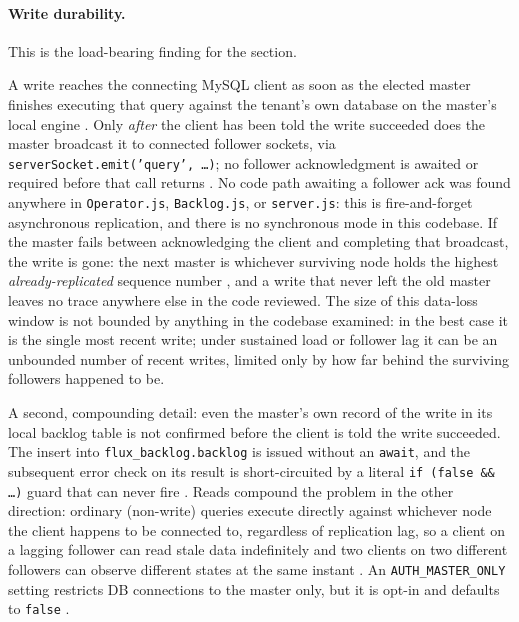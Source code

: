 \paragraph{Write durability.} This is the load-bearing finding for the section.

\begin{property}
\label{prop:sharedb-durability}
A write reaches the connecting MySQL client as soon as the elected master finishes
executing that query against the tenant's own database on the master's local engine
. Only \emph{after} the
client has been told the write succeeded does the master broadcast it to connected
follower sockets, via \texttt{serverSocket.emit('query', \ldots)}; no follower
acknowledgment is awaited or required before that call returns
. No code path awaiting
a follower ack was found anywhere in \texttt{Operator.js}, \texttt{Backlog.js}, or
\texttt{server.js}: this is fire-and-forget asynchronous replication, and there is no
synchronous mode in this codebase. If the master fails between acknowledging the
client and completing that broadcast, the write is gone: the next master is whichever
surviving node holds the highest \emph{already-replicated} sequence number
, and a write that never
left the old master leaves no trace anywhere else in the code reviewed. The size of
this data-loss window is not bounded by anything in the codebase examined: in the best
case it is the single most recent write; under sustained load or follower lag it can be
an unbounded number of recent writes, limited only by how far behind the surviving
followers happened to be.
\end{property}

A second, compounding detail: even the master's own record of the write in its local
backlog table is not confirmed before the client is told the write succeeded. The
insert into \texttt{flux\_backlog.\allowbreak{}backlog} is issued without an \texttt{await}, and the
subsequent error check on its result is short-circuited by a literal
\texttt{if (false \&\& \ldots)} guard that can never fire
. Reads compound the
problem in the other direction: ordinary (non-write) queries execute directly against
whichever node the client happens to be connected to, regardless of replication lag,
so a client on a lagging follower can read stale data indefinitely and two clients on
two different followers can observe different states at the same instant
. An
\texttt{AUTH\_MASTER\_ONLY} setting restricts DB connections to the master only, but it
is opt-in and defaults to \texttt{false} .

